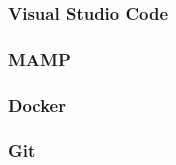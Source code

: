 \hspace{1cm}\subsubsection{Visual Studio Code}

\hspace{1cm}\subsubsection{MAMP}

\hspace{1cm}\subsubsection{Docker}

\hspace{1cm}\subsubsection{Git}



